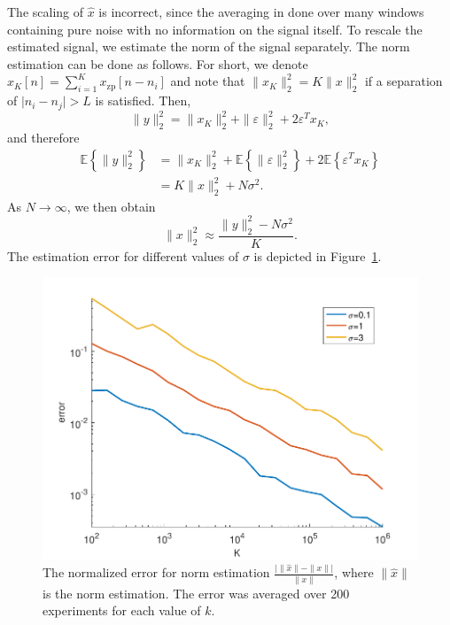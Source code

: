 \documentclass[journal]{IEEEtran}
\numberwithin{equation}{section}
\numberwithin{figure}{section}
\theoremstyle{plain}
\theoremstyle{definition}
\theoremstyle{remark}
\theoremstyle{plain}
\theoremstyle{remark}
\theoremstyle{plain}
\theoremstyle{plain}
\newcommand{\E}[1]{\mathbb{E}\left\{{#1} \right\}}
\newcommand{\xz}{x_{\textrm{zp}}}
\begin{document}
The scaling of $\hat{x}$ is incorrect, since the averaging in done over many windows containing pure noise with no information on the signal itself. 
To rescale the estimated signal, we estimate the norm of the signal separately.
The norm estimation can be done as follows. For short, we denote $x_K[n]=\sum_{i=1}^K \xz[n-n_i]$ and note that $\|x_K\|_2^2 = K\|x\|_2^2$ if a separation of $\vert n_i - n_j\vert >L$ is satisfied. 
Then,
\begin{equation}
\| y\|_2^2 =  \| x_K\|_2^2 + \|\varepsilon\|_2^2 + 2\varepsilon^Tx_K, 
\end{equation}  
and therefore 
\begin{equation}
\begin{split}
\E{\| y\|_2^2} &=  \| x_K\|_2^2 + \E{\|\varepsilon\|_2^2} + 2\E{\varepsilon^Tx_K} \\ 
&= K\|x\|_2^2 + N\sigma^2. 
\end{split}	 
\end{equation}   
As $N\to\infty$,  we then obtain
\begin{equation} \label{eq:norm_estimation}
\|x\|_2^2 \approx \frac{\| y\|_2^2 - N\sigma^2}{K}. 
\end{equation}
The estimation error for different values of $\sigma$ is depicted in Figure~\ref{fig:norn_error}. 

\begin{figure}
	\begin{center}
		\includegraphics[scale = .5]{NormError}		
	\end{center}
	\caption{The normalized error for norm estimation $\frac{\vert \|\hat{x}\|  - \|x\|\vert }{\|x\|}$, where $\|\hat{x}\|$ is the norm estimation. The error was averaged over 200 experiments for each value of $k$.}
	\label{fig:norn_error}
\end{figure}
\end{document}
